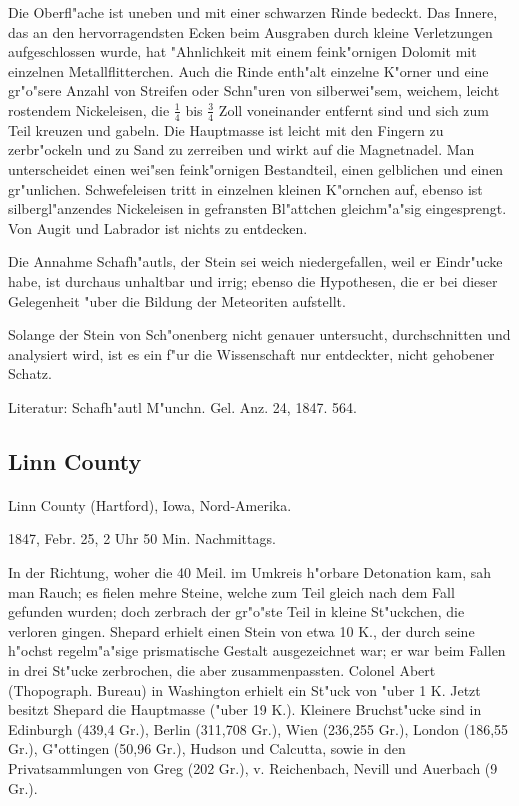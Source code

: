 \documentclass[a4paper, 11pt, oneside]{article}
\begin{document}
Die Oberfl"ache ist uneben und mit einer schwarzen Rinde bedeckt. Das Innere, das an den hervorragendsten Ecken beim Ausgraben durch kleine Verletzungen aufgeschlossen wurde, hat "Ahnlichkeit mit einem feink"ornigen Dolomit mit einzelnen Metallflitterchen. Auch die Rinde enth"alt einzelne K"orner und eine gr"o"sere Anzahl von Streifen oder Schn"uren von silberwei"sem, weichem, leicht rostendem Nickeleisen, die $\frac{1}{4}$ bis $\frac{3}{4}$ Zoll voneinander entfernt sind und sich zum Teil kreuzen und gabeln. Die Hauptmasse ist leicht mit den Fingern zu zerbr"ockeln und zu Sand zu zerreiben und wirkt auf die Magnetnadel. Man unterscheidet einen wei"sen feink"ornigen Bestandteil, einen gelblichen und einen gr"unlichen. Schwefeleisen tritt in einzelnen kleinen K"ornchen auf, ebenso ist silbergl"anzendes Nickeleisen in gefransten Bl"attchen gleichm"a"sig eingesprengt. Von Augit und Labrador ist nichts zu entdecken.

Die Annahme Schafh"autls, der Stein sei weich niedergefallen, weil er Eindr"ucke habe, ist durchaus unhaltbar und irrig; ebenso die Hypothesen, die er bei dieser Gelegenheit "uber die Bildung der Meteoriten aufstellt.

Solange der Stein von Sch"onenberg nicht genauer untersucht, durchschnitten und analysiert wird, ist es ein f"ur die Wissenschaft nur entdeckter, nicht gehobener Schatz.

\footnotesize
Literatur: Schafh"autl M"unchn. Gel. Anz. 24, 1847. 564.

\subsection{Linn County}
\normalsize
\paragraph{}
Linn County (Hartford), Iowa, Nord-Amerika.

1847, Febr. 25, 2 Uhr 50 Min. Nachmittags.

In der Richtung, woher die 40 Meil. im Umkreis h"orbare Detonation kam, sah man Rauch; es fielen mehre Steine, welche zum Teil gleich nach dem Fall gefunden wurden; doch zerbrach der gr"o"ste Teil in kleine St"uckchen, die verloren gingen. Shepard erhielt einen Stein von etwa 10 K., der durch seine h"ochst regelm"a"sige prismatische Gestalt ausgezeichnet war; er war beim Fallen in drei St"ucke zerbrochen, die aber zusammenpassten. Colonel Abert (Thopograph. Bureau) in Washington erhielt ein St"uck von "uber 1 K. Jetzt besitzt Shepard die Hauptmasse ("uber 19 K.). Kleinere Bruchst"ucke sind in Edinburgh (439,4 Gr.), Berlin (311,708 Gr.), Wien (236,255 Gr.), London (186,55 Gr.), G"ottingen (50,96 Gr.), Hudson und Calcutta, sowie in den Privatsammlungen von Greg (202 Gr.), v. Reichenbach, Nevill und Auerbach (9 Gr.).
\end{document}
